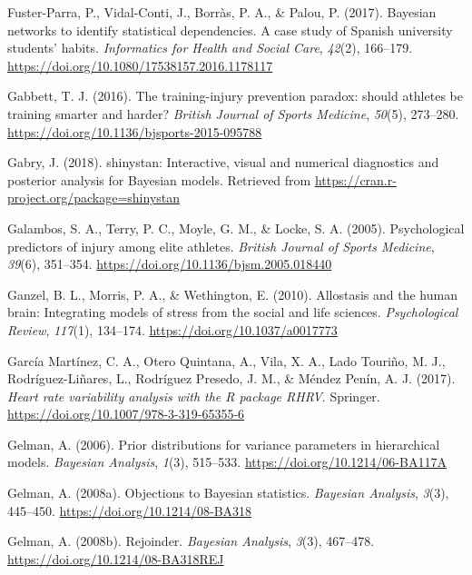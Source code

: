 \documentclass[
  english,
  man,floatsintext]{apa6}
\begin{document}
\leavevmode\hypertarget{ref-Fuster-Parra2017}{}%
Fuster-Parra, P., Vidal-Conti, J., Borràs, P. A., \& Palou, P. (2017). Bayesian networks to identify statistical dependencies. A case study of Spanish university students' habits. \emph{Informatics for Health and Social Care}, \emph{42}(2), 166--179. \url{https://doi.org/10.1080/17538157.2016.1178117}

\leavevmode\hypertarget{ref-Gabbett2016}{}%
Gabbett, T. J. (2016). The training-injury prevention paradox: should athletes be training smarter and harder? \emph{British Journal of Sports Medicine}, \emph{50}(5), 273--280. \url{https://doi.org/10.1136/bjsports-2015-095788}

\leavevmode\hypertarget{ref-Gabry2018}{}%
Gabry, J. (2018). shinystan: Interactive, visual and numerical diagnostics and posterior analysis for Bayesian models. Retrieved from \url{https://cran.r-project.org/package=shinystan}

\leavevmode\hypertarget{ref-Galambos2005}{}%
Galambos, S. A., Terry, P. C., Moyle, G. M., \& Locke, S. A. (2005). Psychological predictors of injury among elite athletes. \emph{British Journal of Sports Medicine}, \emph{39}(6), 351--354. \url{https://doi.org/10.1136/bjsm.2005.018440}

\leavevmode\hypertarget{ref-Ganzel2010}{}%
Ganzel, B. L., Morris, P. A., \& Wethington, E. (2010). Allostasis and the human brain: Integrating models of stress from the social and life sciences. \emph{Psychological Review}, \emph{117}(1), 134--174. \url{https://doi.org/10.1037/a0017773}

\leavevmode\hypertarget{ref-GarciaMartinez2017}{}%
García Martínez, C. A., Otero Quintana, A., Vila, X. A., Lado Touriño, M. J., Rodríguez-Liñares, L., Rodríguez Presedo, J. M., \& Méndez Penín, A. J. (2017). \emph{Heart rate variability analysis with the R package RHRV}. Springer. \url{https://doi.org/10.1007/978-3-319-65355-6}

\leavevmode\hypertarget{ref-Gelman2006a}{}%
Gelman, A. (2006). Prior distributions for variance parameters in hierarchical models. \emph{Bayesian Analysis}, \emph{1}(3), 515--533. \url{https://doi.org/10.1214/06-BA117A}

\leavevmode\hypertarget{ref-Gelman2008a}{}%
Gelman, A. (2008a). Objections to Bayesian statistics. \emph{Bayesian Analysis}, \emph{3}(3), 445--450. \url{https://doi.org/10.1214/08-BA318}

\leavevmode\hypertarget{ref-Gelman2008}{}%
Gelman, A. (2008b). Rejoinder. \emph{Bayesian Analysis}, \emph{3}(3), 467--478. \url{https://doi.org/10.1214/08-BA318REJ}
\end{document}
